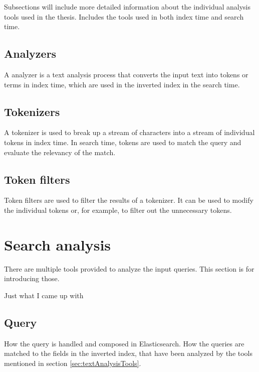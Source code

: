 \todo{} 
Subsections will include more detailed information about the individual analysis tools used in the thesis.
Includes the tools used in both index time and search time.

\subsection{Analyzers}
A analyzer is a text analysis process that converts the input text into tokens or terms in index time, 
which are used in the inverted index in the search time. 
\cite{elasticIntro}

\subsection{Tokenizers}
A tokenizer is used to break up a stream of characters into a stream of individual tokens in index time. 
In search time, tokens are used to match the query and evaluate the relevancy of the match.
\cite{elasticIntro}


\subsection{Token filters}
Token filters are used to filter the results of a tokenizer. 
It can be used to modify the individual tokens or, for example, to filter out the unnecessary tokens.
\cite{elasticIntro}



\section{Search analysis}

There are multiple tools provided to analyze the input queries. This section is for introducing those.
\cite{relevantSearch}

 Just what I came up with 

\subsection{Query}
How the query is handled and composed in Elasticsearch. 
How the queries are matched to the fields in the inverted index, that have been analyzed by the tools mentioned in section \ref{sec:textAnalysisTools}.

